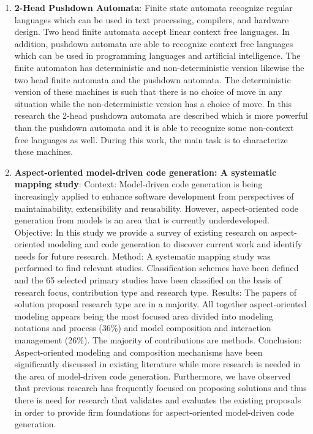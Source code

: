 \begin{englishtext}
\begin{enumerate}
    \item \textbf{2-Head Pushdown Automata}: Finite state automata recognize regular
    languages which can be used in text processing, compilers, and hardware
    design. Two head finite automata accept linear context free languages. In
    addition, pushdown automata are able to recognize context free languages
    which can be used in programming languages and artificial intelligence. The
    finite automaton has deterministic and non-deterministic version likewise
    the two head finite automata and the pushdown automata. The deterministic
    version of these machines is such that there is no choice of move in any
    situation while the non-deterministic version has a choice of move. In this
    research the 2-head pushdown automata are described which is more powerful
    than the pushdown automata and it is able to recognize some non-context free
    languages as well. During this work, the main task is to characterize these
    machines. \cite{pushdownAutomata}

    \item \textbf{Aspect-oriented model-driven code generation: A systematic mapping
    study}: Context: Model-driven code generation is being increasingly applied
    to enhance software development from perspectives of maintainability,
    extensibility and reusability. However, aspect-oriented code generation from
    models is an area that is currently underdeveloped. Objective: In this study
    we provide a survey of existing research on aspect-oriented modeling and
    code generation to discover current work and identify needs for future
    research. Method: A systematic mapping study was performed to find relevant
    studies. Classification schemes have been defined and the 65 selected
    primary studies have been classified on the basis of research focus,
    contribution type and research type. Results: The papers of solution
    proposal research type are in a majority. All together aspect-oriented
    modeling appears being the most focused area divided into modeling notations
    and process (36\%) and model composition and interaction management (26\%).
    The majority of contributions are methods. Conclusion: Aspect-oriented
    modeling and composition mechanisms have been significantly discussed in
    existing literature while more research is needed in the area of
    model-driven code generation. Furthermore, we have observed that previous
    research has frequently focused on proposing solutions and thus there is
    need for research that validates and evaluates the existing proposals in
    order to provide firm foundations for aspect-oriented model-driven code
    generation. \cite{aspectOriented}


\end{enumerate}
\end{englishtext}

